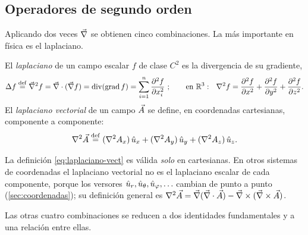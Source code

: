 \subsection{Operadores de segundo orden}\label{sec:segundo-orden}
Aplicando dos veces $\vec{\nabla}$ se obtienen cinco combinaciones. La más importante
en física es el laplaciano.

\begin{definicion}[Laplaciano]\label{def:laplaciano}
El \emph{laplaciano} de un campo escalar $f$ de clase $C^{2}$ es la divergencia
de su gradiente,
\begin{equation}\label{eq:laplaciano}
  \Delta f\mathrel{\overset{\mathrm{def}}{=}}\vec{\nabla}^{2}f=\vec{\nabla}\cdot(\vec{\nabla} f)=\operatorname{div}(\operatorname{grad}f)
  =\sum_{i=1}^{n}\frac{\partial^{2} f}{\partial x_i^{2}}\ ;\qquad
  \text{en }\mathbb{R}^{3}:\ \ \nabla^{2} f=\frac{\partial^{2} f}{\partial x^{2}}+\frac{\partial^{2} f}{\partial y^{2}}+\frac{\partial^{2} f}{\partial z^{2}}.
\end{equation}
El \emph{laplaciano vectorial} de un campo $\vec{A}$ se define, en coordenadas
cartesianas, componente a componente:
\begin{equation}\label{eq:laplaciano-vect}
  \nabla^{2}\vec{A}\mathrel{\overset{\mathrm{def}}{=}}(\nabla^{2} A_x)\,\hat{u}_{x}+(\nabla^{2} A_y)\,\hat{u}_{y}+(\nabla^{2} A_z)\,\hat{u}_{z} .
\end{equation}
\end{definicion}

\begin{observacion}
La definición \eqref{eq:laplaciano-vect} es válida \emph{solo} en cartesianas.
En otros sistemas de coordenadas el laplaciano vectorial no es el laplaciano
escalar de cada componente, porque los versores $\hat{u}_{r},\hat{u}_{\theta},\hat{u}_{\varphi},\ldots$
cambian de punto a punto (\cref{sec:coordenadas}); su definición general es
$\nabla^{2}\vec{A}=\vec{\nabla}(\vec{\nabla}\cdot\vec{A})-\vec{\nabla}\times(\vec{\nabla}\times\vec{A})$.
\end{observacion}

Las otras cuatro combinaciones se reducen a dos identidades fundamentales y a
una relación entre ellas.

